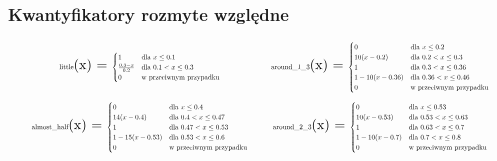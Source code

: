 \documentclass{article}
\begin{document}
\subsubsection{Kwantyfikatory rozmyte względne}

\begin{equation*}
\begin{minipage}{0.5\textwidth}
\centering
\text{\scalebox{0.5}{little}}(x) = \scalebox{0.5}{$
\begin{cases} 
1 & \text{dla } x \leq 0.1 \\
\frac{0.3 - x}{0.2} & \text{dla } 0.1 < x \leq 0.3 \\
0 & \text{w przeciwnym przypadku}
\end{cases}
$}
\end{minipage}%
\begin{minipage}{0.5\textwidth}
\centering
\text{\scalebox{0.5}{around\_1\_3}}(x) = \scalebox{0.5}{$
\begin{cases} 
0 & \text{dla } x \leq 0.2 \\
10(x - 0.2) & \text{dla } 0.2 < x \leq 0.3 \\
1 & \text{dla } 0.3 < x \leq 0.36 \\
1 - 10(x - 0.36) & \text{dla } 0.36 < x \leq 0.46 \\
0 & \text{w przeciwnym przypadku}
\end{cases}
$}
\end{minipage}
\end{equation*}
\begin{equation*}
\begin{minipage}{0.5\textwidth}
\centering
\text{\scalebox{0.5}{almost\_half}}(x) = \scalebox{0.5}{$
\begin{cases} 
0 & \text{dla } x \leq 0.4 \\
14(x - 0.4) & \text{dla } 0.4 < x \leq 0.47 \\
1 & \text{dla } 0.47 < x \leq 0.53 \\
1 - 15(x - 0.53) & \text{dla } 0.53 < x \leq 0.6 \\
0 & \text{w przeciwnym przypadku}
\end{cases}
$}
\end{minipage}%
\begin{minipage}{0.5\textwidth}
\centering
\text{\scalebox{0.5}{around\_2\_3}}(x) = \scalebox{0.5}{$
\begin{cases} 
0 & \text{dla } x \leq 0.53 \\
10(x - 0.53) & \text{dla } 0.53 < x \leq 0.63 \\
1 & \text{dla } 0.63 < x \leq 0.7 \\
1 - 10(x - 0.7) & \text{dla } 0.7 < x \leq 0.8 \\
0 & \text{w przeciwnym przypadku}
\end{cases}
$}
\end{minipage}
\end{equation*}
\end{document}
